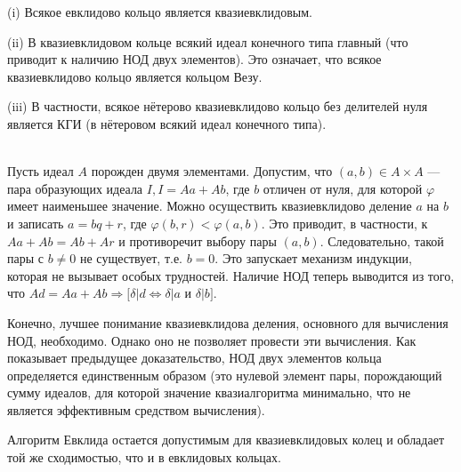 \documentclass{mai_book}
\begin{document}
\begin{predl}
\hspace*{0.5cm}
(i) Всякое евклидово кольцо является квазиевклидовым.

(ii) В квазиевклидовом кольце всякий идеал конечного типа главный (что приводит к наличию НОД двух элементов). Это означает, что всякое квазиевклидово кольцо является кольцом Везу.

(iii) В частности, всякое нётерово квазиевклидово кольцо без дели­телей нуля является КГИ (в нётеровом всякий идеал конечного типа).
\end{predl}
\begin{myproof}
\\
Пусть идеал $A$ порожден двумя элементами. Допустим, что
$(a, b)\in A \times A$ — пара образующих идеала $I, I = Aa + Ab$, где $b$
отличен от нуля, для которой $\varphi$ имеет наименьшее значение. Мож­но осуществить квазиевклидово деление $a$ на $b$ и записать $a=bq+r$,
где $\varphi(b,r) < \varphi(a, b)$. Это приводит, в частности, к $Aa+Ab=Ab+Ar$
и противоречит выбору пары $(a,b)$. Следовательно, такой пары с
$b\neq0$ не существует, т.е. $b=0$. Это запускает механизм индукции,
которая не вызывает особых трудностей. Наличие НОД теперь выводится из того, что $Ad = Aa + Ab \Rightarrow[\delta|d \Longleftrightarrow \delta|a$ и $\delta|b]$.
\end{myproof}
\newpage
\begin{mynotice}
Конечно, лучшее понимание квазиевклидова деления, основного для вычисления НОД, необходимо. Однако оно
не позволяет провести эти вычисления. Как показывает преды­дущее доказательство, НОД двух элементов кольца определяется
единственным образом (это нулевой элемент пары, порождающий
сумму идеалов, для которой значение квазиалгоритма минималь­но, что не является эффективным средством вычисления).\\
\end{mynotice}

Алгоритм Евклида остается допустимым для квазиевклидовых ко­лец и обладает той же сходимостью, что и в евклидовых кольцах.
\end{document}

